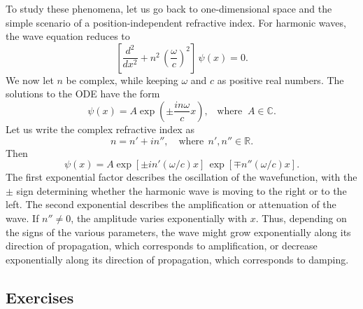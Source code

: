 \documentclass[10pt,a4paper]{article}
\begin{document}
To study these phenomena, let us go back to one-dimensional space and
the simple scenario of a position-independent refractive index. For
harmonic waves, the wave equation reduces to
\begin{equation}
\left[\frac{d^2}{d x^2} + n^2\, \left(\frac{\omega}{c}\right)^2\right] \, \psi(x) = 0.
\end{equation}
We now let $n$ be complex, while keeping $\omega$ and $c$ as
positive real numbers. The solutions to the ODE have the form
\begin{equation}
\psi(x) = A \exp\left(\pm \frac{in\omega}{c}x\right),\;\;\;\mathrm{where}\;\; A \in \mathbb{C}.
\label{eq:gainloss-wave}
\end{equation}
Let us write the complex refractive index as
\begin{equation}
n = n' + i n'',\quad \textrm{where}\;\, n',n'' \in \mathbb{R}.
\end{equation}
Then
\begin{equation}
\psi(x) = A \exp\left[\pm in'(\omega/c)x\right]\, \exp\left[\mp n''(\omega/c)x\right].
\end{equation}
The first exponential factor describes the oscillation of the
wavefunction, with the $\pm$ sign determining whether the harmonic
wave is moving to the right or to the left. The second exponential
describes the amplification or attenuation of the wave. If
$n'' \ne 0$, the amplitude varies exponentially with $x$. Thus,
depending on the signs of the various parameters, the wave might grow
exponentially along its direction of propagation, which corresponds to
amplification, or decrease exponentially along its direction of
propagation, which corresponds to damping.

\subsection{Exercises}
\label{exercises}
\end{document}
